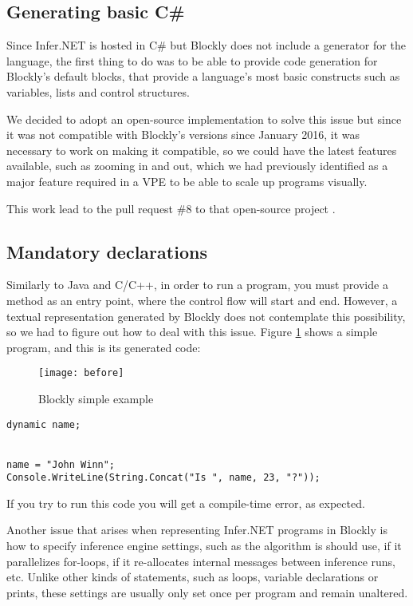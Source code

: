 \subsection{Generating basic C#}

Since Infer.NET is hosted in C# but Blockly does not include a generator for
the language, the first thing to do was to be able to provide code generation for
Blockly's default blocks, that provide a language's most basic constructs such
as variables, lists and control structures.

We decided to adopt an open-source implementation to solve this issue \cite{csgen}
but since it was not compatible with Blockly's versions since January 2016, it
was necessary to work on making it compatible, so we could have the latest features
available, such as zooming in and out, which we had previously identified as a
major feature required in a VPE to be able to scale up programs visually.

This work lead to the pull request \#8 to that open-source project \cite{csgenpr}.

\subsection{Mandatory declarations}

Similarly to Java and C/C++, in order to run a program, you must provide a method
as an entry point, where the control flow will start and end. However, a textual
representation generated by Blockly does not contemplate this possibility, so
we had to figure out how to deal with this issue. Figure \ref{fig:before} shows a simple program,
and this is its generated code:

\begin{figure}[t]
  \begin{center}
    \leavevmode
    \texttt{[image: before]}
    \caption{Blockly simple example}
    \label{fig:before}
  \end{center}
\end{figure}

\begin{lstlisting}
dynamic name;


name = "John Winn";
Console.WriteLine(String.Concat("Is ", name, 23, "?"));
\end{lstlisting}

If you try to run this code you will get a compile-time error, as expected.

Another issue that arises when representing Infer.NET programs in Blockly is how
to specify inference engine settings, such as the algorithm is should use, if it
parallelizes for-loops, if it re-allocates internal messages between inference
runs, etc. Unlike other kinds of statements, such as loops, variable declarations
or prints, these settings are usually only set once per program and remain
unaltered.

